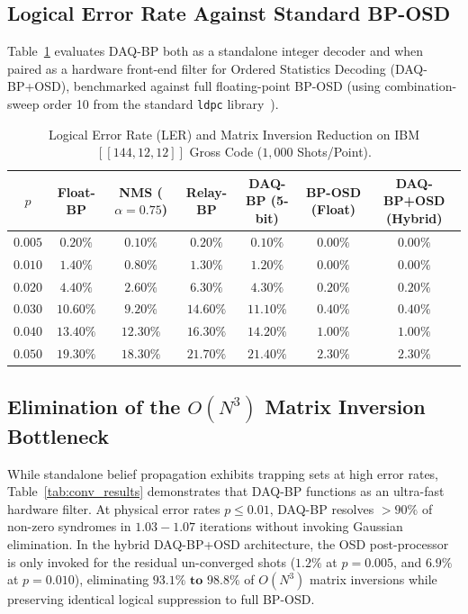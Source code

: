 \documentclass[aps,prxquantum,reprint,twocolumn,superscriptaddress,nofootinbib]{revtex4-2}
\begin{document}
\subsection{Logical Error Rate Against Standard BP-OSD}

Table~\ref{tab:ler_results} evaluates DAQ-BP both as a standalone integer decoder and when paired as a hardware front-end filter for Ordered Statistics Decoding (DAQ-BP+OSD), benchmarked against full floating-point BP-OSD (using combination-sweep order 10 from the standard \texttt{ldpc} library~\cite{roffe2020decoding}).

\begin{table}[t]
\centering
\caption{Logical Error Rate (LER) and Matrix Inversion Reduction on IBM $[[144, 12, 12]]$ Gross Code ($1,000$ Shots/Point).}
\label{tab:ler_results}
\begin{tabular}{ccccccc}
\toprule
$p$ & Float-BP & NMS ($\alpha=0.75$) & Relay-BP & \textbf{DAQ-BP (5-bit)} & \textbf{BP-OSD (Float)} & \textbf{DAQ-BP+OSD (Hybrid)} \\
\midrule
$0.005$ & $0.20\%$ & $0.10\%$ & $0.20\%$ & $\mathbf{0.10\%}$ & $0.00\%$ & $\mathbf{0.00\%}$ \\
$0.010$ & $1.40\%$ & $0.80\%$ & $1.30\%$ & $\mathbf{1.20\%}$ & $0.00\%$ & $\mathbf{0.00\%}$ \\
$0.020$ & $4.40\%$ & $2.60\%$ & $6.30\%$ & $\mathbf{4.30\%}$ & $0.20\%$ & $\mathbf{0.20\%}$ \\
$0.030$ & $10.60\%$ & $9.20\%$ & $14.60\%$ & $\mathbf{11.10\%}$ & $0.40\%$ & $\mathbf{0.40\%}$ \\
$0.040$ & $13.40\%$ & $12.30\%$ & $16.30\%$ & $\mathbf{14.20\%}$ & $1.00\%$ & $\mathbf{1.00\%}$ \\
$0.050$ & $19.30\%$ & $18.30\%$ & $21.70\%$ & $\mathbf{21.40\%}$ & $2.30\%$ & $\mathbf{2.30\%}$ \\
\bottomrule
\end{tabular}
\end{table}

\subsection{Elimination of the $O(N^3)$ Matrix Inversion Bottleneck}

While standalone belief propagation exhibits trapping sets at high error rates, Table~\ref{tab:conv_results} demonstrates that DAQ-BP functions as an ultra-fast hardware filter. At physical error rates $p \le 0.01$, DAQ-BP resolves $>90\%$ of non-zero syndromes in $1.03 - 1.07$ iterations without invoking Gaussian elimination. In the hybrid DAQ-BP+OSD architecture, the OSD post-processor is only invoked for the residual un-converged shots ($1.2\%$ at $p=0.005$, and $6.9\%$ at $p=0.010$), eliminating $\mathbf{93.1\% \text{ to } 98.8\%}$ of $O(N^3)$ matrix inversions while preserving identical logical suppression to full BP-OSD.
\end{document}
